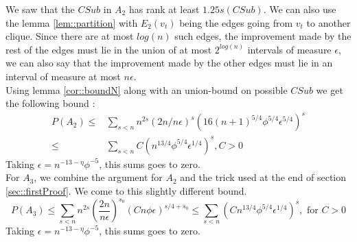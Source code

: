 We saw that the $CSub$ in $A_2$ has rank at least $1.25s(CSub)$. We can also use the lemma \ref{lem::partition} with $E_2(v_t)$ being the edges going from $v_t$ to another clique. Since there are at most $log(n)$ such edges, the improvement made by the rest of the edges must lie in the union of at most $2^{log(n)}$ intervals of measure $\epsilon$, we can also say that the improvement made by the other edges must lie in an interval of measure at most $n\epsilon$.\\
Using lemma \ref{cor::boundN} along with an union-bound on possible $CSub$ we get the following bound :
 \begin{equation*}
 \begin{split}
 P(A_2) \leq &\sum_{s<n}n^{2s}(2n/n\epsilon)^s (16(n + 1)^{5/4}\phi^{5/4}\epsilon^{5/4})^s \\
 \leq & \sum_{s<n} C(n^{13/4}\phi^{5/4}\epsilon^{1/4})^s,  C > 0
 \end{split}
 \end{equation*}
 Taking $\epsilon = n^{-13-\eta}\phi^{-5}$, this sums goes to zero.\\
 
 For $A_3$, we combine the argument for $A_2$ and the trick used at the end of section \ref{sec::firstProof}. We come to this slightly different bound.
 \begin{equation*}
P(A_3) \leq  \sum_{s < n}n^{2s}(\dfrac{2n}{n\epsilon})^{s_0}(Cn\phi\epsilon)^{s/4 + s_0} \leq \sum_{s < n}(Cn^{13/4}\phi^{5/4}\epsilon^{1/4})^{s}, \text{ for } C > 0 
\end{equation*}
 Taking $\epsilon = n^{-13-\eta}\phi^{-5}$, this sums goes to zero.
